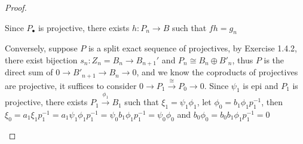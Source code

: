 \documentclass[../main.tex]{subfiles}
\begin{document}
\begin{proof}
\begin{center}
\end{center}
Since $P_\bullet$ is projective, there exists $h:P_n\to B$ such that $fh=g_n$ \par
Conversely, suppose $P$ is a split exact sequence of projectives, by Exercise 1.4.2, there exist bijection $s_n:Z_n=B_n\to B_{n+1}'$ and $P_n\cong B_n\oplus B'_n$, thus $P$ is the direct sum of $0\to B'_{n+1}\to B_n\to0$, and we know the coproducts of projectives are projective, it suffices to consider $0\to P_1\xrightarrow{\cong}P_0\to 0$. Since $\psi_1$ is epi and $P_1$ is projective, there exists $P_1\xrightarrow{\phi_1}B_1$ such that $\xi_1=\psi_1\phi_1$, let $\phi_0=b_1\phi_1p_1^{-1}$, then $\xi_0=a_1\xi_1p_1^{-1}=a_1\psi_1\phi_1p_1^{-1}=\psi_0b_1\phi_1p_1^{-1}=\psi_0\phi_0$ and $b_0\phi_0=b_0b_1\phi_1p_1^{-1}=0$
\begin{center}
\end{center}
\end{proof}
\end{document}
